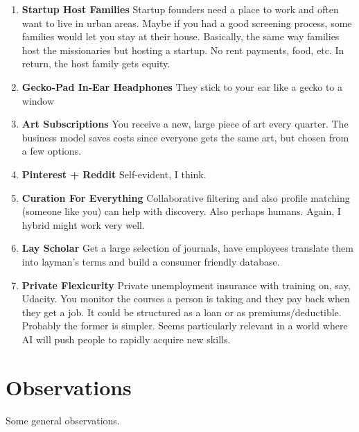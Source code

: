 \documentclass[paper=a4, fontsize=11pt]{scrartcl} %
\numberwithin{equation}{section} %
\numberwithin{figure}{section} %
\numberwithin{table}{section} %
\begin{document}
\begin{enumerate}
\item \textbf{Startup Host Families}  Startup founders need a place to work and often want to live in urban areas.  Maybe if you had a good screening process, some families
would let you stay at their house.  Basically, the same way families host the missionaries but hosting a startup.  No rent payments, food, etc.  In return, the host family gets equity.

\item \textbf{Gecko-Pad In-Ear Headphones} They stick to your ear like a gecko to a window

\item \textbf{Art Subscriptions} You receive a new, large piece of art every quarter.  The business model saves costs since everyone gets the same art, but chosen from a few options. 

\item \textbf{Pinterest + Reddit} Self-evident, I think.

\item \textbf{Curation For Everything} Collaborative filtering and also profile matching (someone like you) can help with discovery.  Also perhaps humans.  Again, I hybrid might work very well.  

\item \textbf{Lay Scholar} Get a large selection of journals, have employees translate them into layman's terms and build a consumer friendly database.  

\item \textbf{Private Flexicurity} Private unemployment insurance with training on, say, Udacity.  You monitor the courses a person is taking and they pay back when they get a job.  It could be structured as a loan or as premiums/deductible.  Probably the former is simpler.  Seems particularly relevant in a world where AI will push people to rapidly acquire new skills.

\end{enumerate}




\section{Observations}

Some general observations.
 
\end{document}
